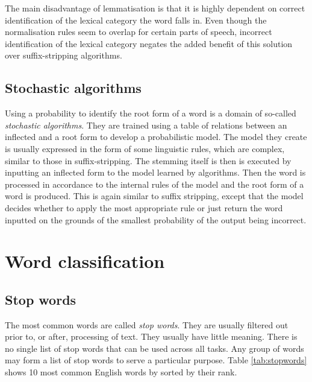       The main disadvantage of lemmatisation is that it is highly dependent on correct identification of the lexical category the word falls in. Even though the normalisation rules seem to overlap for certain parts of speech, incorrect identification of the lexical category negates the added benefit of this solution over suffix-stripping algorithms.

    \subsection{Stochastic algorithms}

      Using a probability to identify the root form of a word is a domain of so-called \emph{stochastic algorithms}. They are trained using a table of relations between an inflected and a root form to develop a probabilistic model. The model they create is usually expressed in the form of some linguistic rules, which are complex, similar to those in suffix-stripping. The stemming itself is then is executed by inputting an inflected form to the model learned by algorithms. Then the word is processed in accordance to the internal rules of the model and the root form of a word is produced. This is again similar to suffix stripping, except that the model decides whether to apply the most appropriate rule or just return the word inputted on the grounds of the smallest probability of the output being incorrect.

  \section{Word classification}
      
    \subsection{Stop words}

      The most common words are called \emph{stop words}. They are usually filtered out prior to, or after, processing of text. They usually have little meaning. There is no single list of stop words that can be used across all tasks. Any group of words may form a list of stop words to serve a particular purpose. Table \ref{tab:stopwords} shows 10 most common English words by sorted by their rank\cite{OxfordEnglishCorpus}.
      
